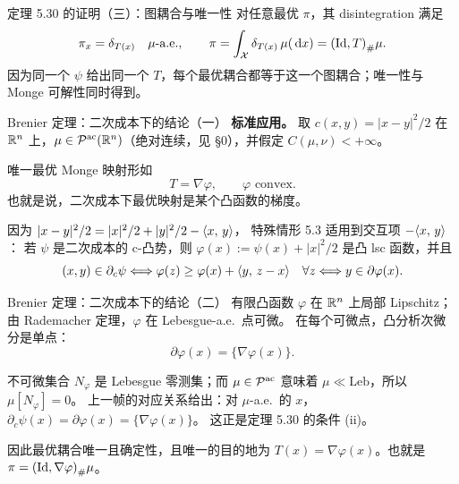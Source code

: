 \begin{frame}{定理 5.30 的证明（三）：图耦合与唯一性}
  对任意最优 $\pi$，其 disintegration 满足
  \[
    \pi_x=\delta_{T(x)}\quad \mu\text{-a.e.},
    \qquad
    \pi=\int_{\mathcal{X}}\delta_{T(x)}\,\mu(\,\mathrm{d} x)={(\mathrm{Id},T)}_{\#}\mu.
  \]
  因为同一个 $\psi$ 给出同一个 $T$，每个最优耦合都等于这一个图耦合；唯一性与 Monge 可解性同时得到。\proofskipnote

\end{frame}

\begin{frame}{Brenier 定理：二次成本下的结论（一）}
  \textbf{标准应用。} 取 $c(x,y)=|x-y|^2/2$ 在 $\mathbb{R}^n$ 上，$\mu\in\mathcal{P}^{\mathrm{ac}}(\mathbb{R}^n)$（绝对连续，见 §0），并假定 $C(\mu,\nu)<+\infty$。

  唯一最优 Monge 映射形如
  \[
    T=\nabla\varphi,
    \qquad
    \varphi \text{ convex}.
  \]
  也就是说，二次成本下最优映射是某个凸函数的梯度。

  因为
  $|x-y|^2/2=|x|^2/2+|y|^2/2-\langle x,\,y\rangle$，
  特殊情形 5.3 适用到交互项 $-\langle x,\,y\rangle$：
  若 $\psi$ 是二次成本的 c-凸势，则
  $\varphi(x):=\psi(x)+|x|^2/2$ 是凸 lsc 函数，并且
  \[
    (x,y)\in\partial_c\psi
    \Longleftrightarrow
    \varphi(z)\ge\varphi(x)+\langle y,\,z-x\rangle\quad \forall z
    \Longleftrightarrow
    y\in\partial\varphi(x).
  \]

\end{frame}

\begin{frame}{Brenier 定理：二次成本下的结论（二）}
  有限凸函数 $\varphi$ 在 $\mathbb{R}^n$ 上局部 Lipschitz；由 Rademacher 定理，$\varphi$ 在 Lebesgue-a.e.\ 点可微。
  在每个可微点，凸分析次微分是单点：
  \[
    \partial\varphi(x)=\{\nabla\varphi(x)\}.
  \]

  不可微集合 $N_{\varphi}$ 是 Lebesgue 零测集；而 $\mu\in\mathcal{P}^{\mathrm{ac}}$ 意味着
  $\mu\ll\mathrm{Leb}$，所以 $\mu[N_{\varphi}]=0$。
  上一帧的对应关系给出：对 $\mu$-a.e.\ 的 $x$，
  $\partial_c\psi(x)=\partial\varphi(x)=\{\nabla\varphi(x)\}$。
  这正是定理 5.30 的条件 (ii)。

  因此最优耦合唯一且确定性，且唯一的目的地为
  $T(x)=\nabla\varphi(x)$。也就是 $\pi={(\mathrm{Id},\nabla\varphi)}_{\#}\mu$。

\end{frame}


